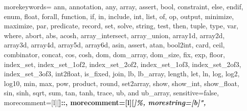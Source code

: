 
{
morekeywords={
ann, annotation, any, array, assert, bool, constraint, else, endif, enum, float, forall, function,
if, in, include, int, list, of, op, output, minimize, maximize, par, predicate, record, set,
solve, string, test, then, tuple, type, var, where,
abort, abs, acosh, array_intersect, array_union,
array1d, array2d, array3d, array4d, array5d, array6d, asin, assert, atan, bool2int, card,
ceil, combinator, concat, cos, cosh, dom, dom_array, dom_size, fix, exp, floor, index_set, index_set_1of2,
index_set_2of2, index_set_1of3, index_set_2of3, index_set_3of3, int2float, is_fixed,
join, lb, lb_array, length, let, ln, log, log2, log10, min, max, pow, product, round, set2array,
show, show_int, show_float, sin, sinh, sqrt, sum, tan, tanh, trace, ub, and ub_array},
sensitive=false, %
morecomment=[l][\bfseries\color{OrangeRed}]{::},
morecomment=[l][\em\color{ForestGreen}]{\%},
morestring=[b]",
}


